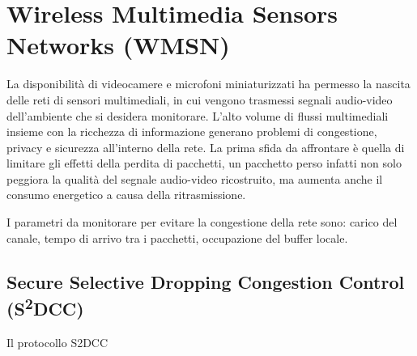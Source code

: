 \section{Wireless Multimedia Sensors Networks (WMSN)}

	La disponibilità di videocamere e microfoni miniaturizzati ha permesso la nascita delle reti di sensori multimediali, in cui vengono trasmessi segnali audio-video dell'ambiente che si desidera monitorare.
	L'alto volume di flussi multimediali insieme con la ricchezza di informazione generano problemi di congestione, privacy e sicurezza all'interno della rete.
	La prima sfida da affrontare è quella di limitare gli effetti della perdita di pacchetti, un pacchetto perso infatti non solo peggiora la qualità del segnale audio-video ricostruito, ma aumenta anche il consumo energetico a causa della ritrasmissione.
	
	I parametri da monitorare per evitare la congestione della rete sono: carico del canale, tempo di arrivo tra i pacchetti, occupazione del buffer locale.
	
	
\subsection{Secure Selective Dropping Congestion Control (S\textsuperscript{2}DCC)}

	Il protocollo S2DCC
